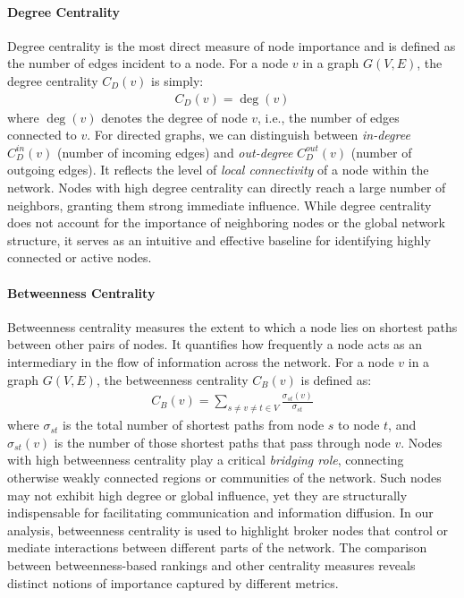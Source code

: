 \paragraph{Degree Centrality}
Degree centrality\citep{centralityclarify, centralitymeasures} 
is the most direct measure of node importance and is defined as the number of edges incident to a node. 
For a node $v$ in a graph $G(V,E)$, the degree centrality $C_D(v)$ is simply:
\begin{align} \label{form:degree}
    C_D(v) = \deg(v)
\end{align}
where $\deg(v)$ denotes the degree of node $v$, i.e., the number of edges connected to $v$.
For directed graphs, we can distinguish between \emph{in-degree} $C_D^{in}(v)$ (number of incoming edges) 
and \emph{out-degree} $C_D^{out}(v)$ (number of outgoing edges).
It reflects the level of \emph{local connectivity} of a node within the network.
Nodes with high degree centrality can directly reach a large number of neighbors, granting them strong immediate influence. 
While degree centrality does not account for the importance of neighboring nodes or the global network structure, 
it serves as an intuitive and effective baseline for identifying highly connected or active nodes.


\paragraph{Betweenness Centrality}
Betweenness centrality\citep{betweennesscentrality, fastercentrality}
measures the extent to which a node lies on shortest paths between other pairs of nodes. 
It quantifies how frequently a node acts as an intermediary in the flow of information across the network.
For a node $v$ in a graph $G(V,E)$, the betweenness centrality $C_B(v)$ is defined as:
\begin{align} \label{form:betweenness}
    C_B(v) = \sum_{s \neq v \neq t \in V} \frac{\sigma_{st}(v)}{\sigma_{st}}
\end{align}
where $\sigma_{st}$ is the total number of shortest paths from node $s$ to node $t$, 
and $\sigma_{st}(v)$ is the number of those shortest paths that pass through node $v$.
Nodes with high betweenness centrality play a critical \emph{bridging role}, 
connecting otherwise weakly connected regions or communities of the network. 
Such nodes may not exhibit high degree or global influence, yet they are structurally indispensable for facilitating communication and information diffusion.
In our analysis, betweenness centrality is used to highlight broker nodes that control or mediate interactions between different parts of the network. 
The comparison between betweenness-based rankings and other centrality measures reveals distinct notions of importance captured by different metrics.

